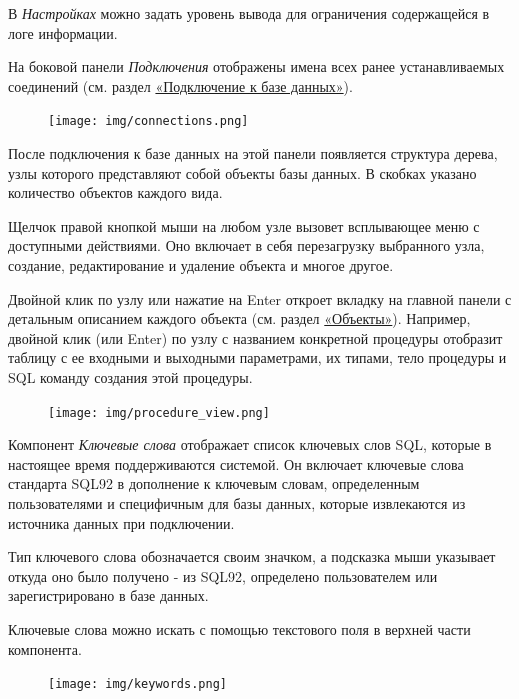  В \textit{Настройках} можно задать уровень вывода для ограничения содержащейся в логе информации.


На боковой панели \textit{Подключения} отображены имена всех ранее устанавливаемых соединений (см. раздел \hyperref[sec:connections]{«Подключение к базе данных»}). 

\begin{figure}[H]
	\centering
	\texttt{[image: img/connections.png]}
\end{figure}

После подключения к базе данных на этой панели появляется структура дерева, узлы которого представляют собой объекты базы данных. В скобках указано количество объектов каждого вида.

Щелчок правой кнопкой мыши на любом узле вызовет всплывающее меню с доступными действиями. Оно включает в себя перезагрузку выбранного узла, создание, редактирование и удаление объекта и многое другое.

Двойной клик по узлу или нажатие на Enter  откроет вкладку на главной панели с детальным описанием каждого объекта (см. раздел \hyperref[sec:objects]{«Объекты»}). Например, двойной клик (или Enter) по узлу с названием конкретной процедуры отобразит таблицу с ее входными и выходными параметрами, их типами, тело процедуры и SQL команду создания этой процедуры.

\begin{figure}[H]
	\centering
	\texttt{[image: img/procedure\_view.png]}
\end{figure}


Компонент \textit{Ключевые слова} отображает список ключевых слов SQL, которые в настоящее время поддерживаются системой. Он включает ключевые слова стандарта SQL92 в дополнение к ключевым словам, определенным пользователями и специфичным для базы данных, которые извлекаются из источника данных при подключении.

Тип ключевого слова обозначается своим значком, а подсказка мыши указывает откуда оно было получено - из SQL92, определено пользователем или зарегистрировано в базе данных.

Ключевые слова можно искать с помощью текстового поля в верхней части компонента.

\begin{figure}[H]
	\centering
	\texttt{[image: img/keywords.png]}
\end{figure}

